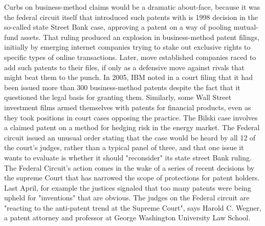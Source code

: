 Curbs on business-method claims would be a dramatic about-face, because it was the federal circuit itself that introduced such patents with is 1998 decision in the so-called state Street Bank case, approving a patent on a way of pooling mutual-fund assets. That ruling produced an explosion in business-method patent filings, initially by emerging internet companies trying to stake out exclusive rights to specific types of online transactions. Later, move established companies raced to add such patents to their files, if only as a defensive move against rivals that might beat them to the punch. In 2005, IBM noted in a court filing that it had been issued more than 300 business-method patents despite the fact that it questioned the legal basis for granting them. Similarly, some Wall Street investment films armed themselves with patents for financial products, even as they took positions in court cases opposing the practice.
The Bilski case involves a claimed patent on a method for hedging risk in the energy market. The Federal circuit issued an unusual order stating that the case would be heard by all 12 of the court's judges, rather than a typical panel of three, and that one issue it wants to evaluate is whether it should "reconsider" its state street Bank ruling.
The Federal Circuit's action comes in the wake of a series of recent decisions by the supreme Court that has narrowed the scope of protections for patent holders. Last April, for example the justices signaled that too many patents were being upheld for "inventions" that are obvious. The judges on the Federal circuit are "reacting to the anti-patent trend at the Supreme Court", says Harold C. Wegner, a patent attorney and professor at George Washington University Law School.
